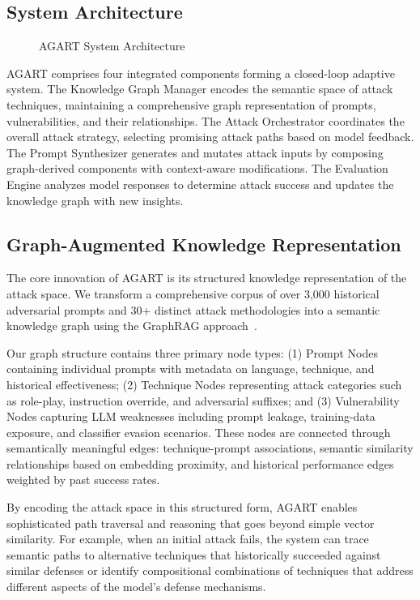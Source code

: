 \subsection{System Architecture}
\begin{figure}[h]
\centering
\caption{AGART System Architecture}
\label{fig:architecture}
\end{figure}

AGART comprises four integrated components forming a closed-loop adaptive system. The Knowledge Graph Manager encodes the semantic space of attack techniques, maintaining a comprehensive graph representation of prompts, vulnerabilities, and their relationships. The Attack Orchestrator coordinates the overall attack strategy, selecting promising attack paths based on model feedback. The Prompt Synthesizer generates and mutates attack inputs by composing graph-derived components with context-aware modifications. The Evaluation Engine analyzes model responses to determine attack success and updates the knowledge graph with new insights.

\subsection{Graph-Augmented Knowledge Representation}
The core innovation of AGART is its structured knowledge representation of the attack space. We transform a comprehensive corpus of over 3,000 historical adversarial prompts and 30+ distinct attack methodologies into a semantic knowledge graph using the GraphRAG approach~\cite{GraphRAG}. 

Our graph structure contains three primary node types: (1) Prompt Nodes containing individual prompts with metadata on language, technique, and historical effectiveness; (2) Technique Nodes representing attack categories such as role-play, instruction override, and adversarial suffixes; and (3) Vulnerability Nodes capturing LLM weaknesses including prompt leakage, training-data exposure, and classifier evasion scenarios. These nodes are connected through semantically meaningful edges: technique-prompt associations, semantic similarity relationships based on embedding proximity, and historical performance edges weighted by past success rates.

By encoding the attack space in this structured form, AGART enables sophisticated path traversal and reasoning that goes beyond simple vector similarity. For example, when an initial attack fails, the system can trace semantic paths to alternative techniques that historically succeeded against similar defenses or identify compositional combinations of techniques that address different aspects of the model's defense mechanisms.

